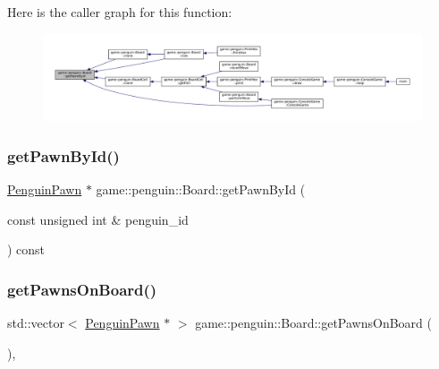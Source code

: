 Here is the caller graph for this function\+:
\nopagebreak
\begin{figure}[H]
\begin{center}
\leavevmode
\includegraphics[width=350pt]{classgame_1_1penguin_1_1_board_acae84c13dacef3bd988d1ea9a41d055f_icgraph}
\end{center}
\end{figure}
\mbox{\label{classgame_1_1penguin_1_1_board_a169a4af29387bc09929e12af674adc62}} 
\subsubsection{\texorpdfstring{get\+Pawn\+By\+Id()}{getPawnById()}\hspace{0.1cm}{\footnotesize\ttfamily [2/2]}}
{\footnotesize\ttfamily \hyperlink{classgame_1_1penguin_1_1_penguin_pawn}{Penguin\+Pawn} $\ast$ game\+::penguin\+::\+Board\+::get\+Pawn\+By\+Id (\begin{DoxyParamCaption}\item[{const unsigned int \&}]{penguin\+\_\+id }\end{DoxyParamCaption}) const}

\mbox{\label{classgame_1_1penguin_1_1_board_a13a38d7c935dd363d7ec9394488539ee}} 
\subsubsection{\texorpdfstring{get\+Pawns\+On\+Board()}{getPawnsOnBoard()}}
{\footnotesize\ttfamily std\+::vector$<$ \hyperlink{classgame_1_1penguin_1_1_penguin_pawn}{Penguin\+Pawn} $\ast$ $>$ game\+::penguin\+::\+Board\+::get\+Pawns\+On\+Board (\begin{DoxyParamCaption}{ }\end{DoxyParamCaption})\hspace{0.3cm}{\ttfamily [override]}, {\ttfamily [virtual]}}



